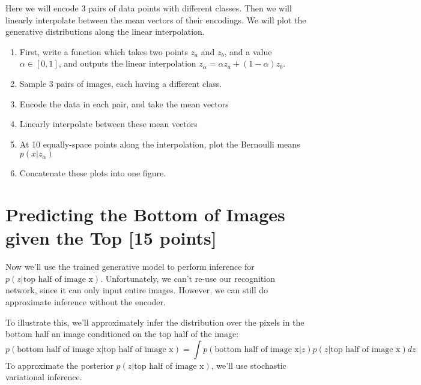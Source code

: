 \documentclass{article}
\begin{document}
\begin{enumerate}[label=(\alph*)]
	Here we will encode 3 pairs of data points with different classes. Then we will linearly interpolate between the mean vectors of their encodings. We will plot the generative distributions along the linear interpolation.
	
	\begin{enumerate}[label=(\alph*)]
		\item First, write a function which takes two points $z_a$ and $z_b$, and a value $\alpha \in [0,1]$, and outputs the linear interpolation $z_\alpha = \alpha z_a + (1 - \alpha) z_b$.
		\item Sample 3 pairs of images, each having a different class.
		\item Encode the data in each pair, and take the mean vectors
		\item Linearly interpolate between these mean vectors
		\item At 10 equally-space points along the interpolation, plot the Bernoulli means $p(x|z_\alpha)$
		\item Concatenate these plots into one figure.
	\end{enumerate}
\end{enumerate}


\pagebreak

\section{Predicting the Bottom of Images given the Top [15 points]}

Now we'll use the trained generative model to perform inference for $p(z|\text{top half of image x})$.
Unfortunately, we can't re-use our recognition network, since it can only input entire images.
However, we can still do approximate inference without the encoder.

To illustrate this, we'll approximately infer the distribution over the pixels in the bottom half an image conditioned on the top half of the image:
$$p(\text{bottom half of image x} | \text{top half of image x}) = \int p(\text{bottom half of image x} | z) p( z | \text{top half of image x}) dz$$
To approximate the posterior $p( z | \text{top half of image x})$, we'll use stochastic variational inference.
\end{document}
